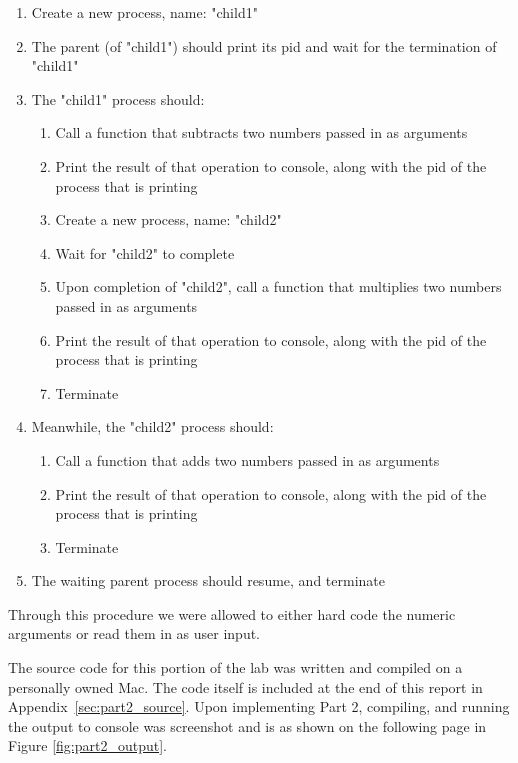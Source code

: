         \begin{enumerate}
            \itemsep0em
            \item Create a new process, name: "child1"
            \item The parent (of "child1") should print its pid and wait for the termination of "child1"
            \item The "child1" process should:
            \begin{enumerate}
                \itemsep0em
                \item Call a function that subtracts two numbers passed in as arguments
                \item Print the result of that operation to console, along with the pid of the process that is printing
                \item Create a new process, name: "child2"
                \item Wait for "child2" to complete
                \item Upon completion of "child2", call a function that multiplies two numbers passed in as arguments
                \item Print the result of that operation to console, along with the pid of the process that is printing
                \item Terminate
            \end{enumerate}
            \item Meanwhile, the "child2" process should:
            \begin{enumerate}
                \itemsep0em
                \item Call a function that adds two numbers passed in as arguments
                \item Print the result of that operation to console, along with the pid of the process that is printing
                \item Terminate
            \end{enumerate}
            \item The waiting parent process should resume, and terminate
        \end{enumerate}
        Through this procedure we were allowed to either hard code the numeric arguments or read them in as user input.

        \medskip
        \noindent The source code for this portion of the lab was written and compiled on a personally owned Mac.
        The code itself is included at the end of this report in Appendix~\ref{sec:part2_source}.
        Upon implementing Part 2, compiling, and running the output to console was screenshot and is as shown on the following page in Figure \ref{fig:part2_output}.

